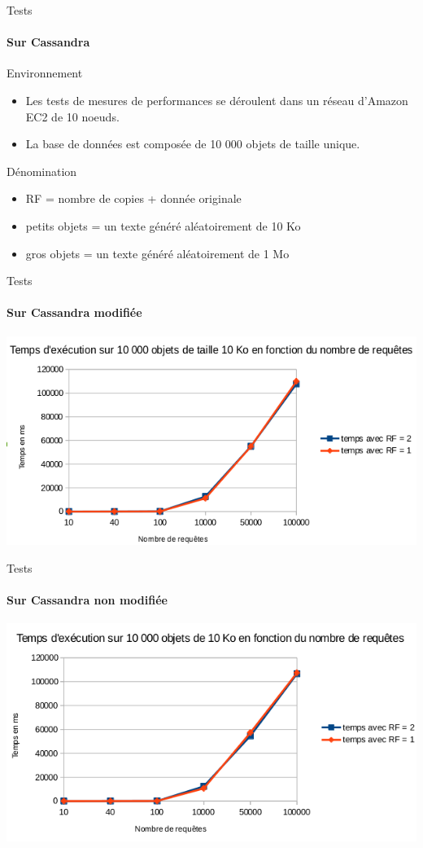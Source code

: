 \documentclass{beamer}
\begin{document}
\begin{frame}{Tests}
\framesubtitle{Sur Cassandra}
\begin{block}{Environnement}
    \begin{itemize}
        \item Les tests de mesures de performances se déroulent dans un réseau d'Amazon EC2 de 10 noeuds.
        \item La base de données est composée de 10 000 objets de taille unique.
    \end{itemize}
\end{block}
\begin{block}{Dénomination}
    \begin{itemize}
        \item RF = nombre de copies + donnée originale
        \item petits objets = un texte généré aléatoirement de 10 Ko
        \item gros objets = un texte généré aléatoirement de 1 Mo
    \end{itemize}
\end{block}
\end{frame}

\begin{frame}{Tests}
\framesubtitle{Sur Cassandra modifiée}
\centering
    \includegraphics[scale=0.6]{PAF-RF-PO}
\end{frame}

\begin{frame}{Tests}
\framesubtitle{Sur Cassandra non modifiée}
\centering
    \includegraphics[scale=0.6]{cassandra_non_modif-RF-PO}
\end{frame}
\end{document}
